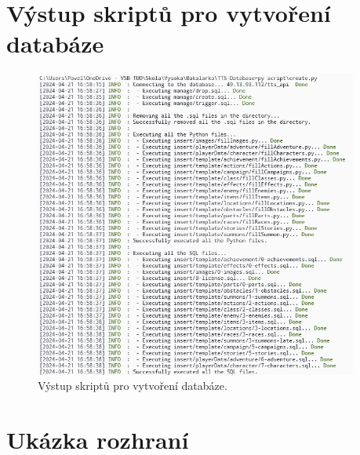 \chapter{Výstup skriptů pro vytvoření databáze}
\label{ch:appendix-database-scripts-output}

\vspace{-4em}

\begin{figure}[ht]
    \centering
    \includegraphics[width=0.95\textwidth]{figures/dbScriptsOutput}
    \caption{Výstup skriptů pro vytvoření databáze.}
    \label{fig:databaseScriptsOutput}
\end{figure}

\chapter{Ukázka rozhraní}
\label{ch:appendix-interface-screenshots}

\vspace{-4em}

